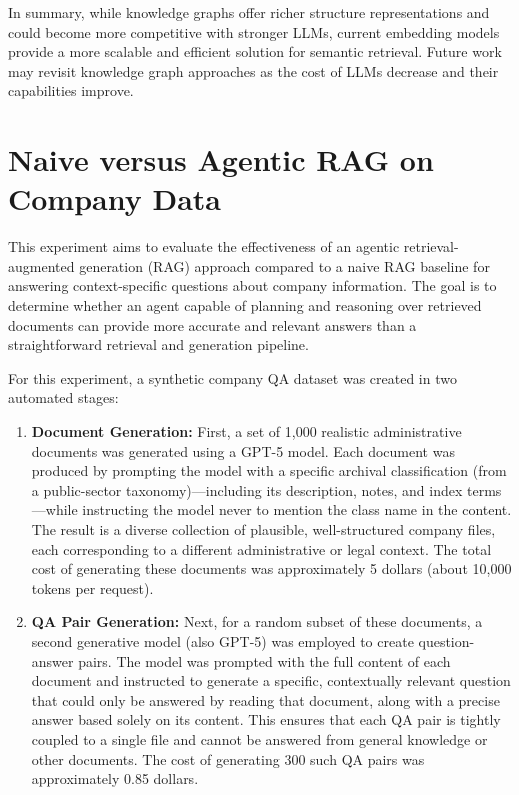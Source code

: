 In summary, while knowledge graphs offer richer structure representations and could become more competitive with stronger \glspl{LLM}, current embedding models provide a more scalable and efficient solution for semantic retrieval. Future work may revisit knowledge graph approaches as the cost of \glspl{LLM} decrease and their capabilities improve.

\section{Naive versus Agentic RAG on Company Data}
\label{sec:expNaiveVsAgenticRAG}
This experiment aims to evaluate the effectiveness of an agentic retrieval-augmented generation (\gls{RAG}) approach compared to a naive \gls{RAG} baseline for answering context-specific questions about company information. The goal is to determine whether an agent capable of planning and reasoning over retrieved documents can provide more accurate and relevant answers than a straightforward retrieval and generation pipeline.

For this experiment, a synthetic company QA dataset was created in two automated stages:
\begin{enumerate}
        \item \textbf{Document Generation:} First, a set of 1,000 realistic administrative documents was generated using a \gls{GPT}-5 model. Each document was produced by prompting the model with a specific archival classification (from a public-sector taxonomy)—including its description, notes, and index terms—while instructing the model never to mention the class name in the content. The result is a diverse collection of plausible, well-structured company files, each corresponding to a different administrative or legal context. The total cost of generating these documents was approximately 5 dollars (about 10,000 tokens per request).
        \item \textbf{QA Pair Generation:} \label{subsec:qa-generation} Next, for a random subset of these documents, a second generative model (also \gls{GPT}-5) was employed to create question-answer pairs. The model was prompted with the full content of each document and instructed to generate a specific, contextually relevant question that could only be answered by reading that document, along with a precise answer based solely on its content. This ensures that each QA pair is tightly coupled to a single file and cannot be answered from general knowledge or other documents. The cost of generating 300 such QA pairs was approximately 0.85 dollars.
\end{enumerate}

